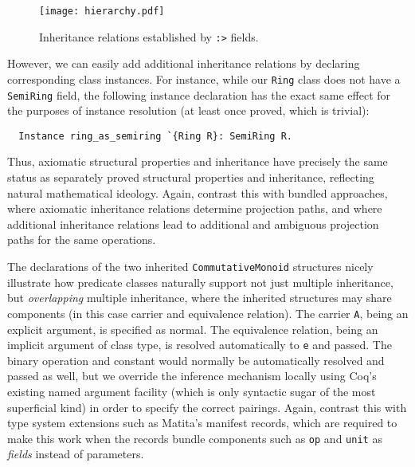 \documentclass[a4paper,10pt,runningheads]{llncs}
\begin{document}
\begin{figure}
\label{inheritancediagram}
\centering
\texttt{[image: hierarchy.pdf]}
\caption{Inheritance relations established by \lstinline|:>| fields.}
\end{figure}


However, we can easily add additional inheritance relations by declaring corresponding class instances. For instance, while our \lstinline|Ring| class does not have a \lstinline|SemiRing| field, the following instance declaration has the exact same effect for the purposes of instance resolution (at least once proved, which is trivial):
\begin{lstlisting}
  Instance ring_as_semiring `{Ring R}: SemiRing R.
\end{lstlisting}

Thus, axiomatic structural properties and inheritance have precisely the same status as separately proved structural properties and inheritance, reflecting natural mathematical ideology. Again, contrast this with bundled approaches, where axiomatic inheritance relations determine projection paths, and where additional inheritance relations lead to additional and ambiguous projection paths for the same operations.


The declarations of the two inherited \lstinline|CommutativeMonoid| structures nicely illustrate how predicate classes naturally support not just multiple inheritance, but \emph{overlapping} multiple inheritance, where the inherited structures may share components (in this case carrier and equivalence relation). The carrier \lstinline|A|, being an explicit argument, is specified as normal. The equivalence relation, being an implicit argument of class type, is resolved automatically to \lstinline|e| and passed. The binary operation and constant would normally be automatically resolved and passed as well, but we override the inference mechanism locally using Coq's existing named argument facility (which is only syntactic sugar of the most superficial kind) in order to specify the correct pairings. 
Again, contrast this with type system extensions such as Matita's manifest records, which are required to make this work when the records bundle components such as \lstinline|op| and \lstinline{unit} as \emph{fields} instead of parameters.
\end{document}
